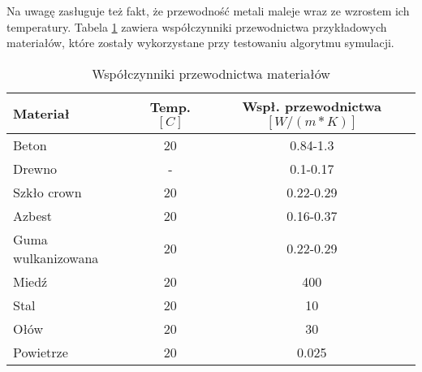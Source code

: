 Na uwagę zasługuje też fakt, że przewodność metali maleje wraz ze wzrostem ich temperatury.
Tabela \ref {przewodnictwa} zawiera współczynniki przewodnictwa przykładowych materiałów, które zostały wykorzystane przy
testowaniu algorytmu symulacji.
\begin{table}
\begin {center}
\begin{tabular} {|l | c | c|}
\hline
Materiał & Temp. $[C]$ & Wspł. przewodnictwa $[W/(m*K)]$ \\ \hline
Beton & 20 & 0.84-1.3  \\ \hline
Drewno & - & 0.1-0.17  \\ \hline
Szkło crown & 20 & 0.22-0.29  \\ \hline
Azbest & 20 & 0.16-0.37 \\ \hline
Guma wulkanizowana & 20 & 0.22-0.29 \\ \hline
Miedź & 20 & 400 \\ \hline
Stal & 20 & 10 \\ \hline
Ołów & 20 & 30 \\ \hline
Powietrze & 20 & 0.025 \\ 
\hline
\end {tabular}
\caption{Współczynniki przewodnictwa materiałów}
\label{przewodnictwa}
\end{center}
\end {table}
